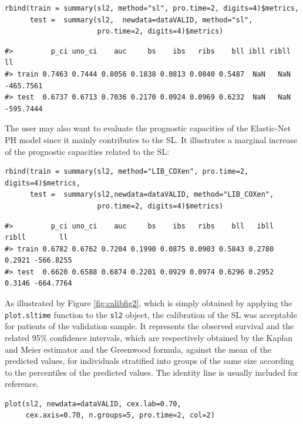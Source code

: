 \begin{verbatim}
rbind(train = summary(sl2, method="sl", pro.time=2, digits=4)$metrics,
      test =  summary(sl2,  newdata=dataVALID, method="sl",
                      pro.time=2, digits=4)$metrics)
\end{verbatim}

\begin{verbatim}
#>         p_ci uno_ci    auc     bs    ibs   ribs    bll ibll ribll        ll
#> train 0.7463 0.7444 0.8056 0.1838 0.0813 0.0840 0.5487  NaN   NaN -465.7561
#> test  0.6737 0.6713 0.7036 0.2170 0.0924 0.0969 0.6232  NaN   NaN -595.7444
\end{verbatim}

The user may also want to evaluate the prognostic capacities of the Elastic-Net PH model since it mainly contributes to the SL. It illustrates a marginal increase of the prognostic capacities related to the SL:

\begin{verbatim}
rbind(train = summary(sl2, method="LIB_COXen", pro.time=2, digits=4)$metrics,
      test =  summary(sl2,newdata=dataVALID, method="LIB_COXen",
                      pro.time=2, digits=4)$metrics)
\end{verbatim}

\begin{verbatim}
#>         p_ci uno_ci    auc     bs    ibs   ribs    bll   ibll  ribll        ll
#> train 0.6782 0.6762 0.7204 0.1990 0.0875 0.0903 0.5843 0.2780 0.2921 -566.8255
#> test  0.6620 0.6588 0.6874 0.2201 0.0929 0.0974 0.6296 0.2952 0.3146 -664.7764
\end{verbatim}

As illustrated by Figure \ref{fig:calibfig2}, which is simply obtained by applying the \texttt{plot.sltime} function to the \texttt{sl2} object, the calibration of the SL was acceptable for patients of the validation sample. It represents the observed survival and the related 95\% confidence intervals, which are respectively obtained by the Kaplan and Meier estimator and the Greenwood formula, against the mean of the predicted values, for individuals stratified into groups of the same size according to the percentiles of the predicted values. The identity line is usually included for reference.

\begin{verbatim}
plot(sl2, newdata=dataVALID, cex.lab=0.70,
     cex.axis=0.70, n.groups=5, pro.time=2, col=2)
\end{verbatim}

